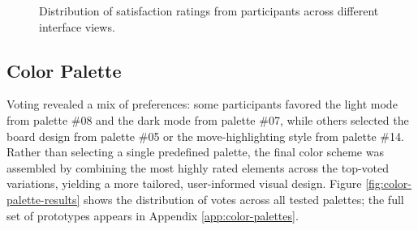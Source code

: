 \begin{figure}[h!]
\centering
{}
\caption[Satisfaction rating distribution]{Distribution of satisfaction ratings from participants across different interface views.}
\label{fig:wireframe-test-results}
\end{figure}



\subsection{Color Palette}
\label{subsec:results-color-palette}
Voting revealed a mix of preferences: some participants favored the light mode from palette \#08 and the dark mode from palette \#07, while others selected the board design from palette \#05 or the move-highlighting style from palette \#14. \\

Rather than selecting a single predefined palette, the final color scheme was assembled by combining the most highly rated elements across the top-voted variations, yielding a more tailored, user-informed visual design. Figure \ref{fig:color-palette-results} shows the distribution of votes across all tested palettes; the full set of prototypes appears in Appendix \ref{app:color-palettes}.

